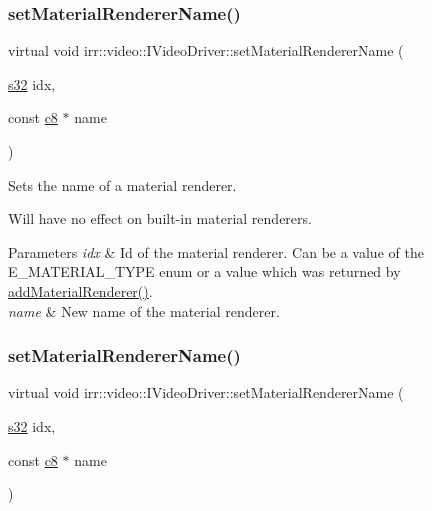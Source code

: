 \subsubsection{\texorpdfstring{set\+Material\+Renderer\+Name()}{setMaterialRendererName()}\hspace{0.1cm}{\footnotesize\ttfamily [1/2]}}
{\footnotesize\ttfamily virtual void irr\+::video\+::\+I\+Video\+Driver\+::set\+Material\+Renderer\+Name (\begin{DoxyParamCaption}\item[{\hyperlink{namespaceirr_ac66849b7a6ed16e30ebede579f9b47c6}{s32}}]{idx,  }\item[{const \hyperlink{namespaceirr_a9395eaea339bcb546b319e9c96bf7410}{c8} $\ast$}]{name }\end{DoxyParamCaption})\hspace{0.3cm}{\ttfamily [pure virtual]}}



Sets the name of a material renderer. 

Will have no effect on built-\/in material renderers. 
\begin{DoxyParams}{Parameters}
{\em idx} & Id of the material renderer. Can be a value of the E\+\_\+\+M\+A\+T\+E\+R\+I\+A\+L\+\_\+\+T\+Y\+PE enum or a value which was returned by \hyperlink{classirr_1_1video_1_1IVideoDriver_a0dfc3a7168f3a73a6f4323b579f03ff6}{add\+Material\+Renderer()}. \\
\hline
{\em name} & New name of the material renderer. \\
\hline
\end{DoxyParams}
\mbox{\label{classirr_1_1video_1_1IVideoDriver_a4ef324ed93094f84832e8d31cf0776f2}} 
\subsubsection{\texorpdfstring{set\+Material\+Renderer\+Name()}{setMaterialRendererName()}\hspace{0.1cm}{\footnotesize\ttfamily [2/2]}}
{\footnotesize\ttfamily virtual void irr\+::video\+::\+I\+Video\+Driver\+::set\+Material\+Renderer\+Name (\begin{DoxyParamCaption}\item[{\hyperlink{namespaceirr_ac66849b7a6ed16e30ebede579f9b47c6}{s32}}]{idx,  }\item[{const \hyperlink{namespaceirr_a9395eaea339bcb546b319e9c96bf7410}{c8} $\ast$}]{name }\end{DoxyParamCaption})\hspace{0.3cm}{\ttfamily [pure virtual]}}



